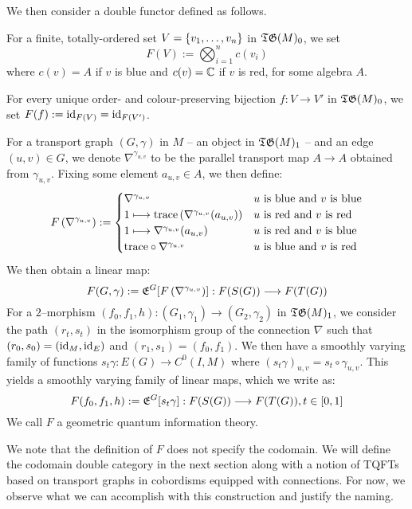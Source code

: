 \documentclass[./Thick_TQFTs_and_Quantum_Information.tex]{subfiles}
\begin{document}
We then consider a double functor defined as follows.

\begin{defn}\label{defn:sing_man_tqft}
For a finite, totally-ordered set $V = \set{v_1, \dots, v_n}$ in $\mathfrak{TG}(M)_0$, we
set
\[
  F(V) := \bigotimes_{i = 1}^{n} c(v_i)
\]
where $c(v) = A$ if $v$ is blue and $c(v) = \mathbb{C}$ if $v$ is red,
for some algebra $A$.

For every unique order- and colour-preserving bijection $f : V \to V'$ in
$\mathfrak{TG}(M)_0$, we set $F(f) := \text{id}_{F(V)} = \text{id}_{F(V')}$.

For a transport graph $(G, \gamma)$ in $M$ -- an object in $\mathfrak{TG}(M)_1$ -- and an
edge $(u, v) \in G$, we denote $\nabla^{\gamma_{u, v}}$ to be the parallel
transport map $A \to A$ obtained from $\gamma_{u, v}$. Fixing some element
$a_{u, v} \in A$, we then define:
\[
  F\left( \nabla^{\gamma_{u, v}} \right) := \begin{cases}
    \nabla^{\gamma_{u, v}}
      & u \text{ is blue and } v \text{ is blue} \\
    1 \longmapsto \text{trace}\left( \nabla^{\gamma_{u, v}}(a_{u, v}) \right)
      & u \text{ is red and } v \text{ is red} \\
    1 \longmapsto \nabla^{\gamma_{u, v}}(a_{u, v})
      & u \text{ is red and } v \text{ is blue} \\
    \text{trace} \circ \nabla^{\gamma_{u, v}}
      & u \text{ is blue and } v \text{ is red}
  \end{cases}
\]
We then obtain a linear map:
\[
  F(G, \gamma) := \mathfrak{E}^{G}[F\left( \nabla^{\gamma_{u, v}} \right)]
    : F(S(G)) \stackrel{}{\longrightarrow} F(T(G))
\]
For a $2$--morphism
$(f_0, f_1, h) : (G_1, \gamma_1) \to (G_2, \gamma_2)$ in $\mathfrak{TG}(M)_1$, we consider
the path $(r_t, s_t)$ in the isomorphism group of the connection $\nabla$ such
that $(r_0, s_0) = (\text{id}_M, \text{id}_E)$ and $(r_1, s_1) = (f_0, f_1)$. We then have a
smoothly varying family of functions $s_t\gamma : E(G) \to C^0(I, M)$
where $(s_t\gamma)_{u, v} = s_t \circ \gamma_{u, v}$. This yields a smoothly
varying family of linear maps, which we write as:
\[
  F(f_0, f_1, h) := \mathfrak{E}^{G}[s_t\gamma]
    : F(S(G)) \stackrel{}{\longrightarrow} F(T(G)), t \in [0, 1]
\]
We call $F$ a geometric quantum information theory.
\end{defn}

We note that the definition of $F$ does not specify the codomain. We will define
the codomain double category in the next section along with a notion of TQFTs
based on transport graphs in cobordisms equipped with connections. For now, we
observe what we can accomplish with this construction and justify the naming.


\end{document}
